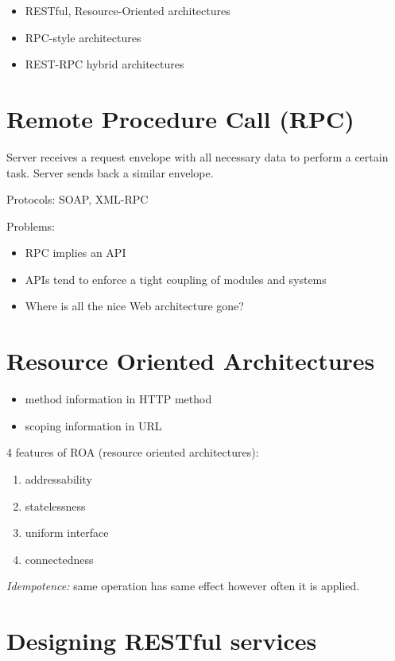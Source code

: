 \documentclass[a4paper]{report}
\begin{document}
\begin{itemize}
  \item RESTful, Resource-Oriented architectures
  \item RPC-style architectures
  \item REST-RPC hybrid architectures
\end{itemize}

\section{Remote Procedure Call (RPC)}

Server receives a request envelope with all necessary data to perform a
certain task. Server sends back a similar envelope.

Protocols: SOAP, XML-RPC

Problems:

\begin{itemize}
  \item RPC implies an API
  \item APIs tend to enforce a tight coupling of modules and systems
  \item Where is all the nice Web architecture gone?
\end{itemize}

\section{Resource Oriented Architectures}

\begin{itemize}
  \item method information in HTTP method
  \item scoping information in URL
\end{itemize}

4 features of ROA (resource oriented architectures):

\begin{enumerate}
  \item addressability
  \item statelessness
  \item uniform interface
  \item connectedness
\end{enumerate}

\emph{Idempotence:} same operation has same effect however often it is applied.

\section{Designing RESTful services}
\end{document}
